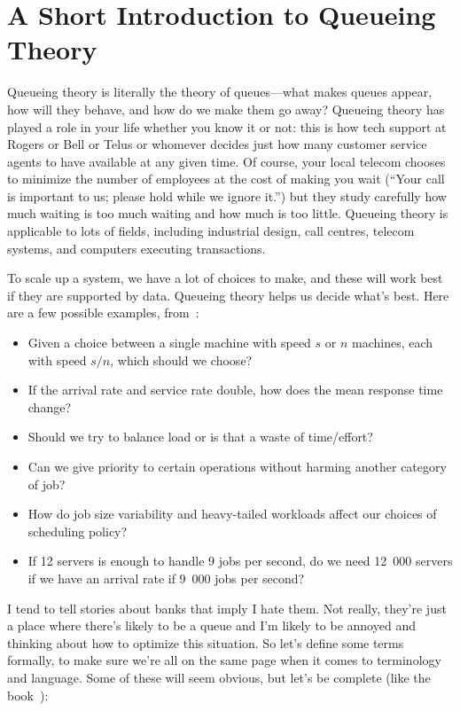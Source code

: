 




\section*{A Short Introduction to Queueing Theory}

Queueing theory is literally the theory of queues---what makes queues appear, how will they behave, and how do we make them go away? Queueing theory has played a role in your life whether you know it or not: this is how tech support at Rogers or Bell or Telus or whomever decides just how many customer service agents to have available at any given time. Of course, your local telecom chooses to minimize the number of employees at the cost of making you wait (``Your call is important to us; please hold while we ignore it.'') but they study carefully how much waiting is too much waiting and how much is too little. Queueing theory is applicable to lots of fields, including industrial design, call centres, telecom systems, and computers executing transactions. 

To scale up a system, we have a lot of choices to make, and these will work best if they are supported by data. Queueing theory helps us decide what's best. Here are a few possible examples, from~\cite{pmd}:

\begin{itemize}
 \item Given a choice between a single machine with speed $s$ or $n$ machines, each with speed $s/n$, which should we choose?
 \item If the arrival rate and service rate double, how does the mean response time change?
 \item Should we try to balance load or is that a waste of time/effort?
 \item Can we give priority to certain operations without harming another category of job?
 \item How do job size variability and heavy-tailed workloads affect our choices of scheduling policy?
 \item If 12 servers is enough to handle 9 jobs per second, do we need 12~000 servers if we have an arrival rate if 9~000 jobs per second?
\end{itemize}

I tend to tell stories about banks that imply I hate them. Not really, they're just a place where there's likely to be a queue and I'm likely to be annoyed and thinking about how to optimize this situation. So let's define some terms formally, to make sure we're all on the same page when it comes to terminology and language. Some of these will seem obvious, but let's be complete (like the book~\cite{swps}):

